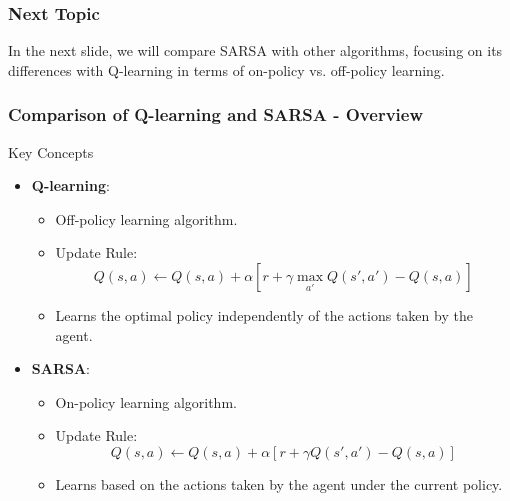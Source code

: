 \documentclass[aspectratio=169]{beamer}
\begin{document}
\begin{frame}[fragile]
    \frametitle{Next Topic}
    In the next slide, we will compare SARSA with other algorithms, focusing on its differences with Q-learning in terms of on-policy vs. off-policy learning.
\end{frame}

\begin{frame}[fragile]
    \frametitle{Comparison of Q-learning and SARSA - Overview}
    \begin{block}{Key Concepts}
        \begin{itemize}
            \item \textbf{Q-learning}:
            \begin{itemize}
                \item Off-policy learning algorithm.
                \item Update Rule:
                \begin{equation}
                Q(s, a) \leftarrow Q(s, a) + \alpha [r + \gamma \max_{a'} Q(s', a') - Q(s, a)]
                \end{equation}
                \item Learns the optimal policy independently of the actions taken by the agent.
            \end{itemize}
            \item \textbf{SARSA}:
            \begin{itemize}
                \item On-policy learning algorithm.
                \item Update Rule:
                \begin{equation}
                Q(s, a) \leftarrow Q(s, a) + \alpha [r + \gamma Q(s', a') - Q(s, a)]
                \end{equation}
                \item Learns based on the actions taken by the agent under the current policy.
            \end{itemize}
        \end{itemize}
    \end{block}
\end{frame}
\end{document}
